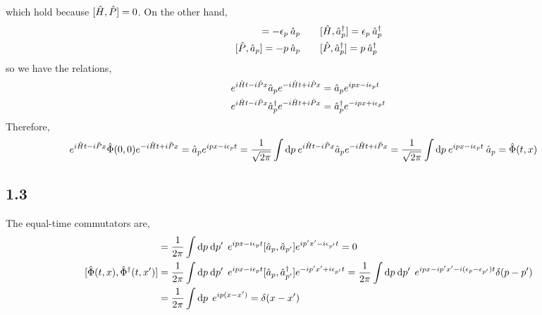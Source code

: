 \documentclass[12pt]{extarticle}
\newcommand{\field}{\hat{\Phi}}
\newcommand{\dfield}{\hat{\Phi}^\dagger}
\begin{document}
which hold because $[\hat{H}, \hat{P}] = 0$. 
On the other hand,
\begin{align*}
[\hamilt, \a_p] = - \epsilon_p \: \a_p \quad & \quad [\hamilt, \adag_p] = \epsilon_p \: \adag_p 
\\
[\hat{P}, \a_p] = - p \: \a_p \quad & \quad [\hat{P}, \adag_p] = p \: \adag_p 
\end{align*}
so we have the relations,
\begin{align*}
e^{i \hat{H} t - i \hat{P} x} \hat{a}_p e^{- i \hat{H} t + i \hat{P} x} & = \hat{a}_p e^{i p x - i \epsilon_p t} 
\\
e^{i \hat{H} t - i \hat{P} x} \hat{a}^\dagger_p e^{- i \hat{H} t + i \hat{P} x} & = \hat{a}^\dagger_p e^{- i p x + i \epsilon_p t}
\end{align*}
Therefore,
\begin{align*}
e^{i \hamilt t - i \hat{P} x} \field(0, 0) e^{- i \hamilt t + i \hat{P} x} & = \a_p e^{i p x - i \epsilon_p t} = \frac{1}{\sqrt{2 \pi}} \int \d{p}  e^{i \hamilt t - i \hat{P} x} \a_p e^{- i \hamilt t + i \hat{P} x} = \frac{1}{\sqrt{2 \pi}} \int \d{p} e^{i p x - i \epsilon_p t} \: \a_p = \field(t, x) 
\end{align*}
\subsection*{1.3}
The equal-time commutators are,
\begin{align*}
[ \field(t, x), \field(t, x')] & = \frac{1}{2\pi} \int \d{p} \d{p'} \: e^{i p x - i \epsilon_p t} [\a_p, \a_{p'}] e^{i p' x' - i \epsilon_{p'} t} = 0 \\
[ \field(t, x), \dfield(t, x')] & = \frac{1}{2\pi} \int \d{p} \d{p'} \: e^{i p x - i \epsilon_p t} [\a_p, \adag_{p'}] e^{-i p' x' + i \epsilon_{p'} t} = \frac{1}{2\pi} \int \d{p} \d{p'} \: e^{i p x - i p' x' - i (\epsilon_p - \epsilon_{p'}) t} \delta(p - p')
\\
& = \frac{1}{2\pi} \int \d{p} \: e^{i p (x - x')} = \delta(x - x')
\end{align*}
\end{document}
